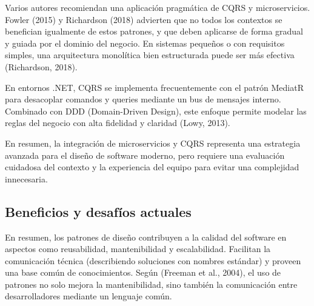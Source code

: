 \documentclass[
  11pt,
  letterpaper,
]{article}
\begin{document}
Varios autores recomiendan una aplicación pragmática de CQRS y
microservicios. Fowler (2015) y Richardson (2018) advierten que no todos
los contextos se benefician igualmente de estos patrones, y que deben
aplicarse de forma gradual y guiada por el dominio del negocio. En
sistemas pequeños o con requisitos simples, una arquitectura monolítica
bien estructurada puede ser más efectiva (Richardson, 2018).

En entornos .NET, CQRS se implementa frecuentemente con el patrón
MediatR para desacoplar comandos y queries mediante un bus de mensajes
interno. Combinado con DDD (Domain-Driven Design), este enfoque permite
modelar las reglas del negocio con alta fidelidad y claridad (Lowy,
2013).

En resumen, la integración de microservicios y CQRS representa una
estrategia avanzada para el diseño de software moderno, pero requiere
una evaluación cuidadosa del contexto y la experiencia del equipo para
evitar una complejidad innecesaria.

\subsection{Beneficios y desafíos
actuales}\label{beneficios-y-desafuxedos-actuales}

En resumen, los patrones de diseño contribuyen a la calidad del software
en aspectos como reusabilidad, mantenibilidad y escalabilidad. Facilitan
la comunicación técnica (describiendo soluciones con nombres estándar) y
proveen una base común de conocimientos. Según (Freeman et al., 2004),
el uso de patrones no solo mejora la mantenibilidad, sino también la
comunicación entre desarrolladores mediante un lenguaje común.
\end{document}
